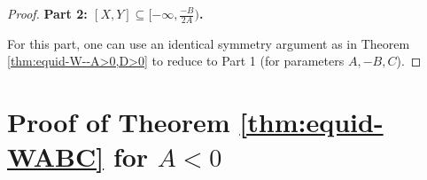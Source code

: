 \documentclass[11pt,letterpaper,reqno]{amsart}
\numberwithin{equation}{section}
\numberwithin{figure}{section}
\numberwithin{table}{section}
\begin{document}
\begin{proof}

\noindent
\textbf{Part 2: $[X,Y] \subseteq [-\infty,\frac{-B}{2A})$. }

For this part, one can use an identical symmetry argument as in Theorem \ref{thm:equid-W--A>0,D>0} to reduce to Part 1 (for parameters $A,-B,C$).
\end{proof}













\section{Proof of Theorem \ref{thm:equid-WABC} for \texorpdfstring{$A<0$}{A<0}}
\label{sec:equid-WABC--A<0}
\end{document}
